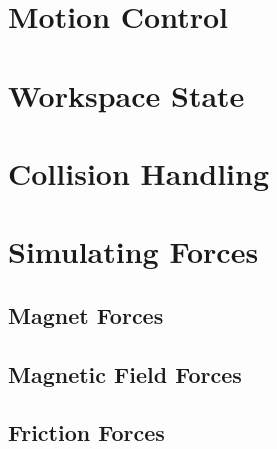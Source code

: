 

\section{Motion Control}
\label{sec:motion_control}


\section{Workspace State}
\label{sec:workspace_state}


\section{Collision Handling}


\section{Simulating Forces}


\subsection{Magnet Forces}


\subsection{Magnetic Field Forces}



\subsection{Friction Forces}



